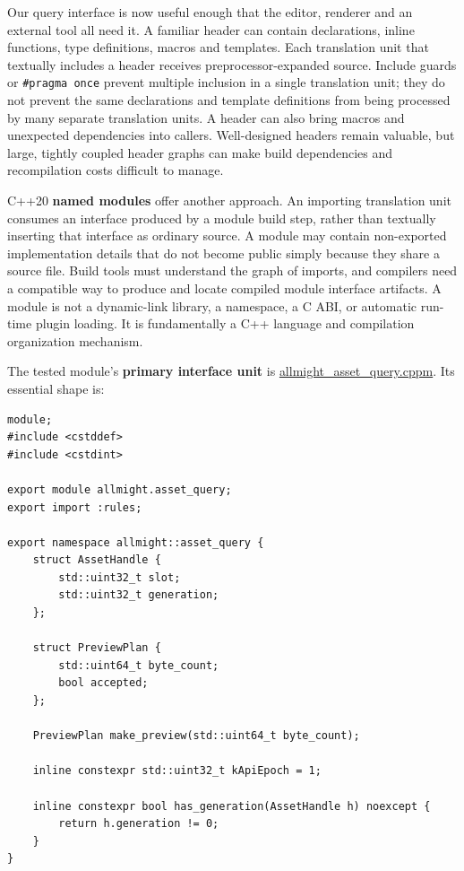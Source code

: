 Our query interface is now useful enough that the editor, renderer and an external tool all need it. A familiar header can contain declarations, inline functions, type definitions, macros and templates. Each translation unit that textually includes a header receives preprocessor-expanded source. Include guards or \texttt{\#pragma\ once} prevent multiple inclusion in a single translation unit; they do not prevent the same declarations and template definitions from being processed by many separate translation units. A header can also bring macros and unexpected dependencies into callers. Well-designed headers remain valuable, but large, tightly coupled header graphs can make build dependencies and recompilation costs difficult to manage.

C++20 \textbf{named modules} offer another approach. An importing translation unit consumes an interface produced by a module build step, rather than textually inserting that interface as ordinary source. A module may contain non-exported implementation details that do not become public simply because they share a source file. Build tools must understand the graph of imports, and compilers need a compatible way to produce and locate compiled module interface artifacts. A module is not a dynamic-link library, a namespace, a C ABI, or automatic run-time plugin loading. It is fundamentally a C++ language and compilation organization mechanism.

The tested module's \textbf{primary interface unit} is \href{tools/modules/allmight_asset_query.cppm}{allmight\_asset\_query.cppm}. Its essential shape is:

\begin{verbatim}
module;
#include <cstddef>
#include <cstdint>

export module allmight.asset_query;
export import :rules;

export namespace allmight::asset_query {
    struct AssetHandle {
        std::uint32_t slot;
        std::uint32_t generation;
    };

    struct PreviewPlan {
        std::uint64_t byte_count;
        bool accepted;
    };

    PreviewPlan make_preview(std::uint64_t byte_count);

    inline constexpr std::uint32_t kApiEpoch = 1;

    inline constexpr bool has_generation(AssetHandle h) noexcept {
        return h.generation != 0;
    }
}
\end{verbatim}


